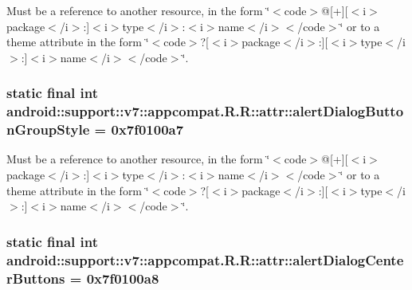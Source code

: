 Must be a reference to another resource, in the form \char`\"{}$<$code$>$@\mbox{[}+\mbox{]}\mbox{[}$<$i$>$package$<$/i$>$:\mbox{]}$<$i$>$type$<$/i$>$:$<$i$>$name$<$/i$>$$<$/code$>$\char`\"{} or to a theme attribute in the form \char`\"{}$<$code$>$?\mbox{[}$<$i$>$package$<$/i$>$:\mbox{]}\mbox{[}$<$i$>$type$<$/i$>$:\mbox{]}$<$i$>$name$<$/i$>$$<$/code$>$\char`\"{}. \hypertarget{classandroid_1_1support_1_1v7_1_1appcompat_1_1_r_1_1attr_ced932ae8fc9acb85d6e8908a97bda5e}{
\subsubsection[{alertDialogButtonGroupStyle}]{\setlength{\rightskip}{0pt plus 5cm}static final int android::support::v7::appcompat.R.R::attr::alertDialogButtonGroupStyle = 0x7f0100a7}}
\label{classandroid_1_1support_1_1v7_1_1appcompat_1_1_r_1_1attr_ced932ae8fc9acb85d6e8908a97bda5e}


Must be a reference to another resource, in the form \char`\"{}$<$code$>$@\mbox{[}+\mbox{]}\mbox{[}$<$i$>$package$<$/i$>$:\mbox{]}$<$i$>$type$<$/i$>$:$<$i$>$name$<$/i$>$$<$/code$>$\char`\"{} or to a theme attribute in the form \char`\"{}$<$code$>$?\mbox{[}$<$i$>$package$<$/i$>$:\mbox{]}\mbox{[}$<$i$>$type$<$/i$>$:\mbox{]}$<$i$>$name$<$/i$>$$<$/code$>$\char`\"{}. \hypertarget{classandroid_1_1support_1_1v7_1_1appcompat_1_1_r_1_1attr_4557b697c9e05bb04b021adfb6e884af}{
\subsubsection[{alertDialogCenterButtons}]{\setlength{\rightskip}{0pt plus 5cm}static final int android::support::v7::appcompat.R.R::attr::alertDialogCenterButtons = 0x7f0100a8}}
\label{classandroid_1_1support_1_1v7_1_1appcompat_1_1_r_1_1attr_4557b697c9e05bb04b021adfb6e884af}


